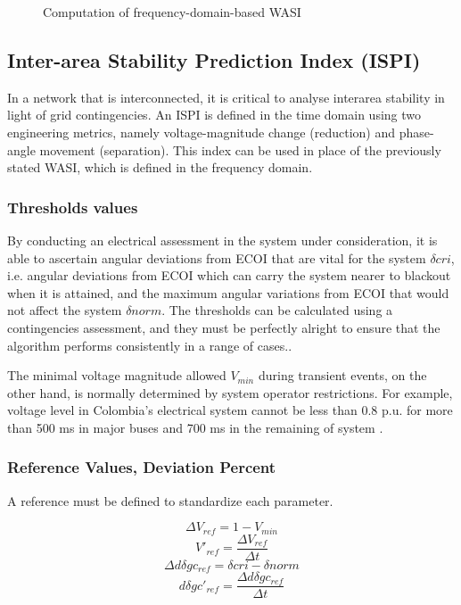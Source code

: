 \begin{figure}%
\centering
{}
\caption{Computation of frequency-domain-based WASI}
\label{fig_WASI}
\end{figure}

\subsection{Inter-area Stability Prediction Index (ISPI)}
\label{ISPI_Intro}
In a network that is interconnected, it is critical to analyse interarea stability in light of grid contingencies. An ISPI is defined \cite{ISPI} in the time domain using two engineering metrics, namely voltage-magnitude change (reduction) and phase-angle movement (separation). This index can be used in place of the previously stated WASI, which is defined in the frequency domain.
\subsubsection{Thresholds values}
By conducting an electrical assessment in the system under consideration, it is able to ascertain angular deviations from ECOI that are vital for the system $\delta cri$, i.e. angular deviations from ECOI which can carry the system nearer to blackout when it is attained, and the maximum angular variations from ECOI that would not affect the system $\delta norm$. The thresholds can be calculated using a contingencies assessment, and they must be perfectly alright to ensure that the algorithm performs consistently in a range of cases..\par

The minimal voltage magnitude allowed $V_{min}$ during transient events, on the other hand, is normally determined by system operator restrictions. For example, voltage level in Colombia's electrical system cannot be less than 0.8 p.u. for more than 500 ms in major buses and 700 ms in the remaining of system \cite{CSA_WASI}.

\subsubsection{Reference Values, Deviation Percent}
A reference must be defined to standardize each parameter.

\begin{equation}
    \Delta V_{ref} = 1 - V_{min}
\end{equation}
\begin{equation}
    V'_{ref} = \frac{\Delta V_{ref}}{\Delta t}
\end{equation}
\begin{equation}
    \Delta d \delta gc_{ref} = \delta cri - \delta norm
\end{equation}
\begin{equation}
    d \delta gc'_{ref} = \frac{\Delta d \delta gc_{ref} }{\Delta t}
\end{equation}

